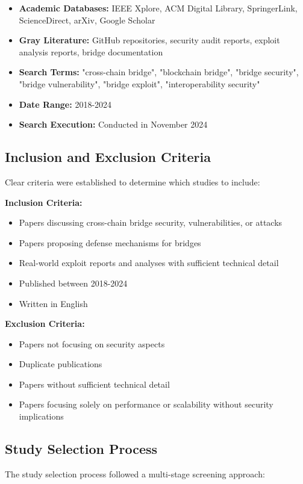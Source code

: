 \documentclass[runningheads]{llncs}
\begin{document}
\begin{itemize}
    \item \textbf{Academic Databases:} IEEE Xplore, ACM Digital Library, SpringerLink, ScienceDirect, arXiv, Google Scholar
    \item \textbf{Gray Literature:} GitHub repositories, security audit reports, exploit analysis reports, bridge documentation
    \item \textbf{Search Terms:} "cross-chain bridge", "blockchain bridge", "bridge security", "bridge vulnerability", "bridge exploit", "interoperability security"
    \item \textbf{Date Range:} 2018-2024
    \item \textbf{Search Execution:} Conducted in November 2024
\end{itemize}

\subsection{Inclusion and Exclusion Criteria}
Clear criteria were established to determine which studies to include:

\textbf{Inclusion Criteria:}
\begin{itemize}
    \item Papers discussing cross-chain bridge security, vulnerabilities, or attacks
    \item Papers proposing defense mechanisms for bridges
    \item Real-world exploit reports and analyses with sufficient technical detail
    \item Published between 2018-2024
    \item Written in English
\end{itemize}

\textbf{Exclusion Criteria:}
\begin{itemize}
    \item Papers not focusing on security aspects
    \item Duplicate publications
    \item Papers without sufficient technical detail
    \item Papers focusing solely on performance or scalability without security implications
\end{itemize}

\subsection{Study Selection Process}
The study selection process followed a multi-stage screening approach:
\end{document}
